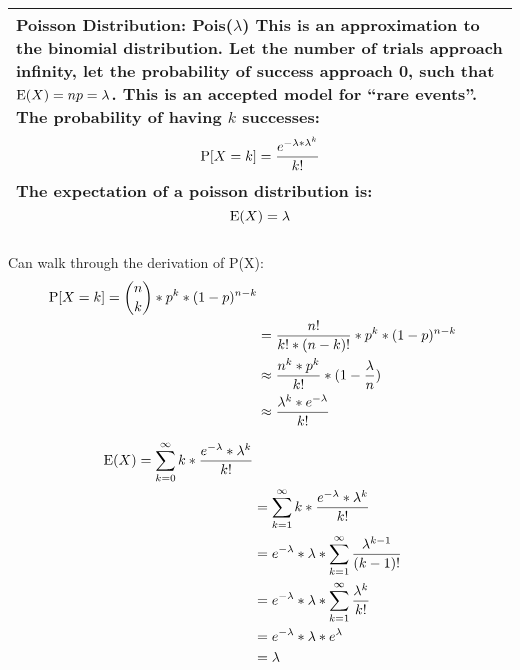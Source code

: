{\tabulinesep=1mm
\begin{tabu}{|p{16cm} |}
\hline
\vspace{2 mm}
\textbf{Poisson Distribution: Pois($\lambda$)}
This is an approximation to the binomial distribution. Let the number 
of trials approach infinity, let the probability of success approach 0, 
such that $\E(X) = np = \lambda$.  This is an accepted model for 
“rare events”. The probability of having $k$ successes:
\[ \P[X = k] = \frac{e^{-\lambda * \lambda^k}}{k!} \]
The expectation of a poisson distribution is:
\[ \E(X) = \lambda \]
\vspace{5 mm}
\\
\hline
\end{tabu}
}

\begin{solution} %
Can walk through the derivation of P(X):
\begin{equation}
\begin{split}
\P[X = k] = {n \choose k} * p^k * (1 - p)^{n - k} \\ \nonumber
&= \frac{n!}{k! * (n - k)!} * p^k * (1 - p)^{n - k} \\
&\approx \frac{n^k * p^k}{k!} * (1 - \frac{\lambda}{n}) \\
&\approx \frac{\lambda^k * e^{-\lambda}}{k!}
\end{split}
\end{equation}

\begin{equation}
\begin{split}
\E(X) = \sum_{k = 0}^{\infty} k* \frac{e^{-\lambda} * \lambda^k}{k!} \\ \nonumber
&= \sum_{k = 1}^{\infty}k * \frac{e^{-\lambda} * \lambda^k}{k!} \\
&= e^{-\lambda} * \lambda * \sum_{k = 1}^{\infty} \frac{\lambda^{k - 1}}{(k - 1)!} \\
&=  e^{-\lambda} * \lambda * \sum_{k = 1}^{\infty} \frac{\lambda^{k}}{k!} \\
&= e^{-\lambda} * \lambda * e^{\lambda} \\
&= \lambda 
\end{split}
\end{equation}

\end{solution}